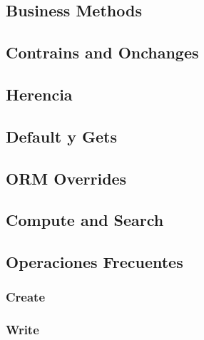 \documentclass[letterpaper,10pt,spanish]{sphinxmanual}
\begin{document}
\subsection{Business Methods}
\label{\detokenize{tecnico/orm-api/metodos:business-methods}}

\subsection{Contrains and Onchanges}
\label{\detokenize{tecnico/orm-api/metodos:contrains-and-onchanges}}

\subsection{Herencia}
\label{\detokenize{tecnico/orm-api/metodos:herencia}}

\subsection{Default y Gets}
\label{\detokenize{tecnico/orm-api/metodos:default-y-gets}}

\subsection{ORM Overrides}
\label{\detokenize{tecnico/orm-api/metodos:orm-overrides}}

\subsection{Compute and Search}
\label{\detokenize{tecnico/orm-api/metodos:compute-and-search}}

\subsection{Operaciones Frecuentes}
\label{\detokenize{tecnico/orm-api/metodos:operaciones-frecuentes}}

\subsubsection{Create}
\label{\detokenize{tecnico/orm-api/operaciones-frecuentes:create}}\label{\detokenize{tecnico/orm-api/operaciones-frecuentes:operaciones-frecuentes}}\label{\detokenize{tecnico/orm-api/operaciones-frecuentes::doc}}

\subsubsection{Write}
\label{\detokenize{tecnico/orm-api/operaciones-frecuentes:write}}
\end{document}
